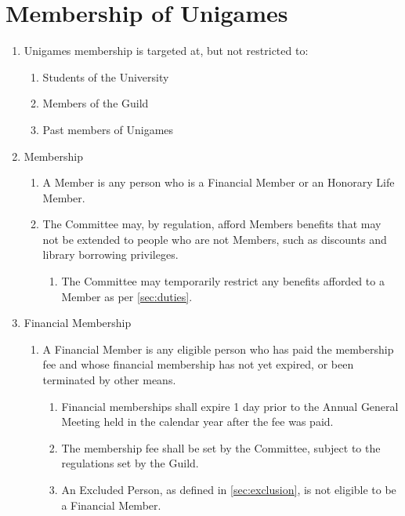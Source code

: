 \documentclass[a4paper]{article}
\begin{document}
\section{Membership of Unigames} \label{sec:membership}
\begin{enumerate}
    \item Unigames membership is targeted at, but not restricted to:
          \begin{enumerate}
              \item Students of the University
              \item Members of the Guild
              \item Past members of Unigames
          \end{enumerate}
    \item Membership
          \begin{enumerate}
              \item A Member is any person who is a Financial Member or an Honorary Life Member.
              \item The Committee may, by regulation, afford Members benefits that may not be extended to people who are not Members, such as discounts and library borrowing privileges.
                    \begin{enumerate}
                        \item The Committee may temporarily restrict any benefits afforded to a Member as per \cref{sec:duties}.
                    \end{enumerate}
          \end{enumerate}
    \item Financial Membership
          \begin{enumerate}
              \item A Financial Member is any eligible person who has paid the membership fee and whose financial membership has not yet expired, or been terminated by other means.
                    \begin{enumerate}
                        \item Financial memberships shall expire 1 day prior to the Annual General Meeting held in the calendar year after the fee was paid.
                        \item The membership fee shall be set by the Committee, subject to the regulations set by the Guild.
                        \item An Excluded Person, as defined in \cref{sec:exclusion}, is not eligible to be a Financial Member.

\end{enumerate}
\end{enumerate}
\end{enumerate}
\end{document}
